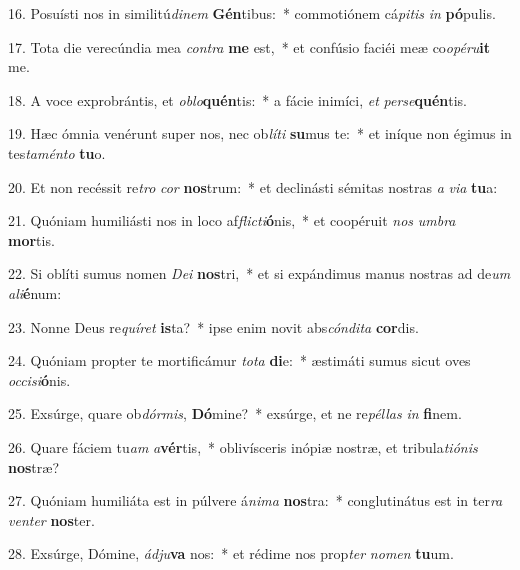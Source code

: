 16. Posuísti nos in similitú\textit{di}\textit{nem} \textbf{Gén}tibus:~*  commotiónem cá\textit{pi}\textit{tis} \textit{in} \textbf{pó}pulis.\

17. Tota die verecúndia mea \textit{con}\textit{tra} \textbf{me} est,~*  et confúsio faciéi meæ co\textit{o}\textit{pé}\textit{ru}\textbf{it} me.\

18. A voce exprobrántis, et \textit{ob}\textit{lo}\textbf{quén}tis:~*  a fácie inimíci, \textit{et} \textit{per}\textit{se}\textbf{quén}tis.\

19. Hæc ómnia venérunt super nos, nec ob\textit{lí}\textit{ti} \textbf{su}mus te:~*  et iníque non égimus in tes\textit{ta}\textit{mén}\textit{to} \textbf{tu}o.\

20. Et non recéssit re\textit{tro} \textit{cor} \textbf{nos}trum:~*  et declinásti sémitas nostras \textit{a} \textit{vi}\textit{a} \textbf{tu}a:\

21. Quóniam humiliásti nos in loco af\textit{flic}\textit{ti}\textbf{ó}nis,~*  et coopéruit \textit{nos} \textit{um}\textit{bra} \textbf{mor}tis.\

22. Si oblíti sumus nomen \textit{De}\textit{i} \textbf{nos}tri,~*  et si expándimus manus nostras ad de\textit{um} \textit{a}\textit{li}\textbf{é}num:\

23. Nonne Deus re\textit{quí}\textit{ret} \textbf{is}ta?~*  ipse enim novit abs\textit{cón}\textit{di}\textit{ta} \textbf{cor}dis.\

24. Quóniam propter te mortificámur \textit{to}\textit{ta} \textbf{di}e:~*  æstimáti sumus sicut oves \textit{oc}\textit{ci}\textit{si}\textbf{ó}nis.\

25. Exsúrge, quare ob\textit{dór}\textit{mis}, \textbf{Dó}mine?~*  exsúrge, et ne re\textit{pél}\textit{las} \textit{in} \textbf{fi}nem.\

26. Quare fáciem tu\textit{am} \textit{a}\textbf{vér}tis,~*  oblivísceris inópiæ nostræ, et tribula\textit{ti}\textit{ó}\textit{nis} \textbf{nos}træ?\

27. Quóniam humiliáta est in púlvere á\textit{ni}\textit{ma} \textbf{nos}tra:~*  conglutinátus est in ter\textit{ra} \textit{ven}\textit{ter} \textbf{nos}ter.\

28. Exsúrge, Dómine, \textit{ád}\textit{ju}\textbf{va} nos:~*  et rédime nos prop\textit{ter} \textit{no}\textit{men} \textbf{tu}um.\

